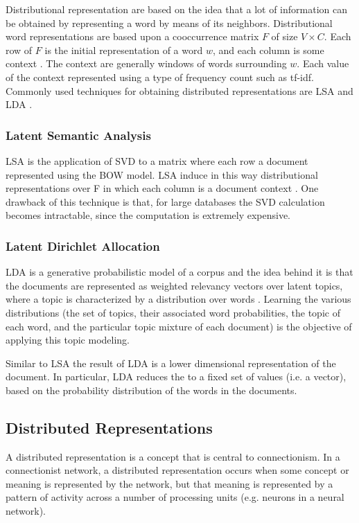 Distributional representation are based on the idea that a lot of
information can be obtained by representing a word by means of its neighbors.
Distributional word representations are based 
upon a cooccurrence matrix $F$ of size $V \times C$.  Each row of $F$ is the
initial representation of a word $w$, and each column is some context
\cite{Turian:2010:WRS:1858681.1858721}. The context  are generally windows of
 words surrounding $w$. Each value of the context  represented using a type of
frequency count such as \ac{tf-idf}. Commonly used techniques for obtaining distributed
representations  are \ac{LSA} \cite{Dumais:1988:ULS:57167.57214} and \ac{LDA}
\cite{Blei:2003:LDA:944919.944937}.


 \subsubsection{Latent Semantic Analysis}
 \label{sec:rel_sa}
\ac{LSA} is the application of \ac{SVD} to a matrix where each row a document
represented using the \ac{BOW} model.
 \ac{LSA} induce in this way  distributional representations over F in which
each column is a document context \cite{Turian:2010:WRS:1858681.1858721}.  
One drawback of this technique is that,  for large databases the SVD
calculation becomes intractable, since the computation is extremely
expensive.

 \subsubsection{Latent Dirichlet Allocation}
 \label{sec:rel_lda}
\ac{LDA} is a generative probabilistic model of a corpus and the
idea behind it is that the documents are represented as weighted relevancy
vectors over latent topics, where a topic is characterized by a distribution over
words \cite{Blei:2003:LDA:944919.944937}.
Learning the various distributions (the set of topics, their associated word
probabilities, the topic of each word, and the particular topic mixture of
each document) is the objective of applying this topic modeling.

Similar to \ac{LSA} the result of \ac{LDA} is a lower dimensional
representation of the document. In particular, LDA
reduces the  to a fixed set of values  (i.e. a vector),  based on the
probability distribution of the words in the documents.

 \subsection{Distributed Representations}
 \label{sec:dis_rep}
A distributed representation is a concept that is central to connectionism.
In a connectionist network, a distributed representation occurs when some
concept or meaning is represented by the network, but that meaning is
represented by a pattern of activity across a number of processing units
(e.g. neurons in a neural network). 

